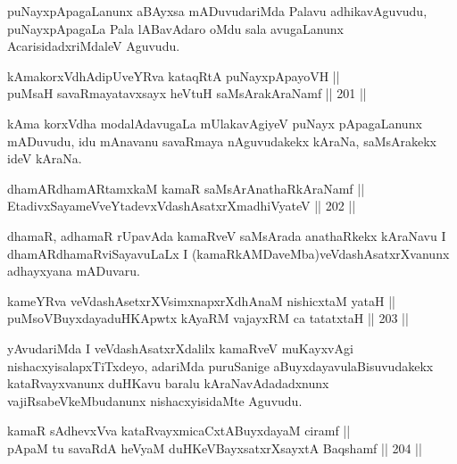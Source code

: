 \begin{artha}
puNayxpApagaLanunx aBAyxsa mADuvudariMda Palavu adhikavAguvudu,
puNayxpApagaLa Pala lABavAdaro oMdu sala avugaLanunx
AcarisidadxriMdaleV Aguvudu.
\end{artha}


\begin{shl}
kAmakorxVdhAdipUveYRva kataqRtA puNayxpApayoVH || \\
puMsaH savaRmayatavxsayx heVtuH saMsArakAraNamf \hfill || 201 ||  
\end{shl}

\begin{artha}
kAma korxVdha modalAdavugaLa mUlakavAgiyeV puNayx pApagaLanunx
mADuvudu, idu mAnavanu savaRmaya nAguvudakekx kAraNa, saMsArakekx ideV
kAraNa.
\end{artha}


\begin{shl}
dhamARdhamARtamxkaM kamaR saMsArAnathaRkAraNamf || \\
EtadivxSayameVveYtadevxVdashAsatxrXmadhiVyateV \hfill || 202 ||  
\end{shl}

\begin{artha}
dhamaR, adhamaR rUpavAda kamaRveV saMsArada anathaRkekx kAraNavu I
dhamARdhamaRviSayavuLaLx I (kamaRkAMDaveMba)veVdashAsatxrXvanunx
adhayxyana mADuvaru.
\end{artha}


\begin{shl}
kameYRva veVdashAsetxrXV\s simxnapxrXdhAnaM nishicxtaM yataH || \\
puMsoV\s BuyxdayaduHKApwtx kAyaRM vajayxRM ca tatatxtaH \hfill || 203 ||  
\end{shl}

\begin{artha}
yAvudariMda I veVdashAsatxrXdalilx kamaRveV muKayxvAgi
nishacxyisalapxTiTxdeyo, adariMda puruSanige aBuyxdayavulaBisuvudakekx
kataRvayxvanunx duHKavu baralu kAraNavAdadadxnunx
vajiRsabeVkeMbudanunx nishacxyisidaMte Aguvudu.
\end{artha}

\begin{shl}
kamaR sAdhevxVva kataRvayxmicaCxtA\s BuyxdayaM ciramf || \\
pApaM tu savaRdA heVyaM duHKeVBayxsatxrXsayxtA Baqshamf \hfill || 204 ||  
\end{shl}


